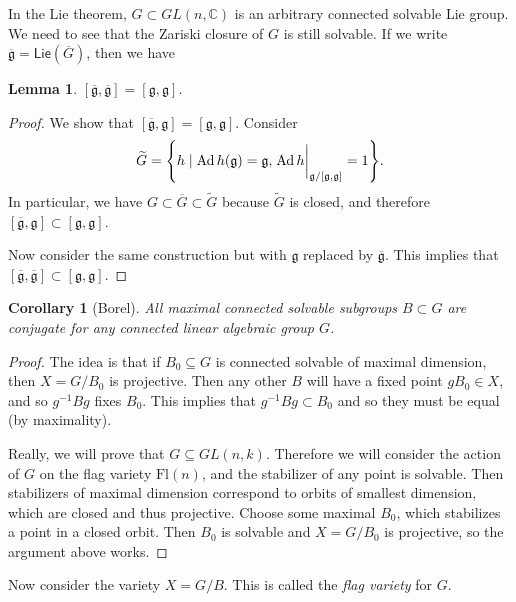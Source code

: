 \documentclass[leqno, openany]{memoir}
\newtheorem{cor}[thm]{Corollary}
\newtheorem{lem}[thm]{Lemma}
\theoremstyle{definition}
\theoremstyle{remark}
\theoremstyle{plain}
\theoremstyle{definition}
\theoremstyle{remark}
\newcommand{\C}{\mathbb{C}}
\newcommand{\mf}[1]{\mathfrak{#1}}
\newcommand{\mr}[1]{\mathrm{#1}}
\newcommand{\ms}[1]{\mathsf{#1}}
\newcommand{\ol}[1]{\overline{#1}}
\newcommand{\wtl}[1]{\widetilde{#1}}
\DeclareMathOperator{\Ad}{Ad}
\begin{document}
In the Lie theorem, $G \subset GL(n, \C)$ is an arbitrary connected solvable
Lie group. We need to see that the Zariski closure of $G$ is still solvable. If
we write $\ol{\mf{g}} = \ms{Lie}(\ol{G})$, then we have

\begin{lem} $[\ol{\mf{g}}, \ol{\mf{g}}] = [\mf{g}, \mf{g}]$.  \end{lem}

\begin{proof} We show that $[\ol{\mf{g}}, \mf{g}] = [\mf{g}, \mf{g}]$. Consider
    \[ \wtl{G} = \qty{h \mid \Ad h (\mf{g}) = \mf{g}, \eval{\Ad h}_{\mf{g} /
    [\mf{g}, \mf{g}]} = 1}. \] In particular, we have $G \subset \ol{G} \subset
    \wtl{G}$ because $\wtl{G}$ is closed, and therefore $[\ol{\mf{g}}, \mf{g}]
    \subset [\mf{g}, \mf{g}]$.

    Now consider the same construction but with $\mf{g}$ replaced by
$\ol{\mf{g}}$. This implies that $[\ol{\mf{g}}, \ol{\mf{g}}] \subset [\mf{g},
\mf{g}]$.  \end{proof}

\begin{cor}[Borel] All maximal connected solvable subgroups $B \subset G$ are
conjugate for any connected linear algebraic group $G$.  \end{cor}

\begin{proof} The idea is that if $B_0 \subseteq G$ is connected solvable of
    maximal dimension, then $X = G/B_0$ is projective. Then any other $B$ will
    have a fixed point $g B_0 \in X$, and so $g^{-1} B g$ fixes $B_0$. This
    implies that $g^{-1}Bg \subset B_0$ and so they must be equal (by
    maximality).

    Really, we will prove that $G \subseteq GL(n, k)$. Therefore we will
consider the action of $G$ on the flag variety $\mr{Fl}(n)$, and the stabilizer
of any point is solvable. Then stabilizers of maximal dimension correspond to
orbits of smallest dimension, which are closed and thus projective. Choose some
maximal $B_0$, which stabilizes a point in a closed orbit. Then $B_0$ is
solvable and $X = G/B_0$ is projective, so the argument above works.
\end{proof}

Now consider the variety $X = G/B$. This is called the \textit{flag variety}
for $G$.
\end{document}
